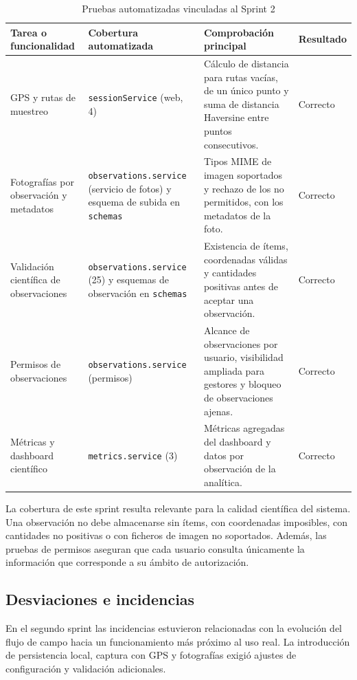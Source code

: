 \begin{table}[H]
\centering
\caption{Pruebas automatizadas vinculadas al Sprint 2}
\label{tab:pruebas_automatizadas_sprint2}
\scriptsize
\begin{tabularx}{\textwidth}{p{3.5cm}p{3cm}X p{1.8cm}}
\toprule
Tarea o funcionalidad & Cobertura automatizada & Comprobación principal & Resultado \\
\midrule
GPS y rutas de muestreo & \texttt{sessionService} (web, 4) & Cálculo de distancia para rutas vacías, de un único punto y suma de distancia Haversine entre puntos consecutivos. & Correcto \\
Fotografías por observación y metadatos & \texttt{observations.service} (servicio de fotos) y esquema de subida en \texttt{schemas} & Tipos MIME de imagen soportados y rechazo de los no permitidos, con los metadatos de la foto. & Correcto \\
Validación científica de observaciones & \texttt{observations.service} (25) y esquemas de observación en \texttt{schemas} & Existencia de ítems, coordenadas válidas y cantidades positivas antes de aceptar una observación. & Correcto \\
Permisos de observaciones & \texttt{observations.service} (permisos) & Alcance de observaciones por usuario, visibilidad ampliada para gestores y bloqueo de observaciones ajenas. & Correcto \\
Métricas y dashboard científico & \texttt{metrics.service} (3) & Métricas agregadas del dashboard y datos por observación de la analítica. & Correcto \\
\bottomrule
\end{tabularx}
\end{table}

La cobertura de este sprint resulta relevante para la calidad científica del sistema. Una observación no debe almacenarse sin ítems, con coordenadas imposibles, con cantidades no positivas o con ficheros de imagen no soportados. Además, las pruebas de permisos aseguran que cada usuario consulta únicamente la información que corresponde a su ámbito de autorización.

\subsection{Desviaciones e incidencias}

En el segundo sprint las incidencias estuvieron relacionadas con la evolución
del flujo de campo hacia un funcionamiento más próximo al uso real. La
introducción de persistencia local, captura con GPS y fotografías exigió ajustes
de configuración y validación adicionales.

